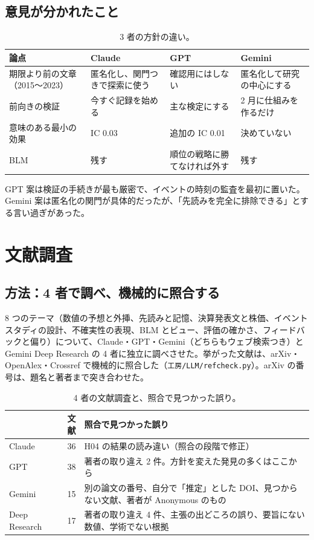\documentclass[xelatex,ja=standard,jafont=haranoaji,a4paper,10pt]{bxjsreport}
\newcommand{\code}[1]{\texttt{#1}}
\begin{document}
\section{意見が分かれたこと}

\begin{table}[H]
\centering
\caption{3 者の方針の違い。}
\small
\begin{tabular}{p{3.2cm}p{3.4cm}p{3.4cm}p{3.4cm}}
\toprule
論点 & Claude & GPT & Gemini \\
\midrule
期限より前の文章（2015〜2023） & 匿名化し、関門つきで探索に使う & 確認用にはしない & 匿名化して研究の中心にする \\
前向きの検証 & 今すぐ記録を始める & 主な検定にする & 2 月に仕組みを作るだけ \\
意味のある最小の効果 & IC 0.03 & 追加の IC 0.01 & 決めていない \\
BLM & 残す & 順位の戦略に勝てなければ外す & 残す \\
\bottomrule
\end{tabular}
\end{table}

GPT 案は検証の手続きが最も厳密で、イベントの時刻の監査を最初に置いた。Gemini 案は匿名化の関門が具体的だったが、「先読みを完全に排除できる」とする言い過ぎがあった。

\chapter{文献調査}\label{ch:lit}

\section{方法：4 者で調べ、機械的に照合する}

8 つのテーマ（数値の予想と外挿、先読みと記憶、決算発表文と株価、イベントスタディの設計、不確実性の表現、BLM とビュー、評価の確かさ、フィードバックと偏り）について、Claude・GPT・Gemini（どちらもウェブ検索つき）と Gemini Deep Research の 4 者に独立に調べさせた。挙がった文献は、arXiv・OpenAlex・Crossref で機械的に照合した（\code{工房/LLM/refcheck.py}）。arXiv の番号は、題名と著者まで突き合わせた。

\begin{table}[H]
\centering
\caption{4 者の文献調査と、照合で見つかった誤り。}
\small
\begin{tabular}{lrp{9.0cm}}
\toprule
& 文献 & 照合で見つかった誤り \\
\midrule
Claude & 36 & H04 の結果の読み違い（照合の段階で修正） \\
GPT & 38 & 著者の取り違え 2 件。方針を変えた発見の多くはここから \\
Gemini & 15 & 別の論文の番号、自分で「推定」とした DOI、見つからない文献、著者が Anonymous のもの \\
Deep Research & 17 & 著者の取り違え 4 件、主張の出どころの誤り、要旨にない数値、学術でない根拠 \\
\bottomrule
\end{tabular}
\end{table}
\end{document}
